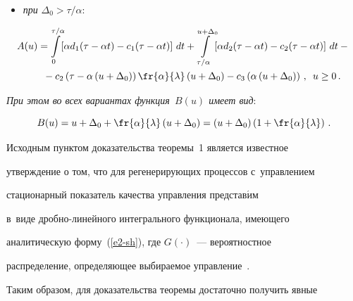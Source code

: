 \begin{itemize}
  

  \item \textit{при} $\Delta_0>\tau/\alpha$:

  \begin{multline}

  \hspace*{-6mm}A(u)=\!\int\limits_0^{\tau/\alpha}\!\! \left[ \alpha d_1(\tau-\alpha t)-c_1(\tau-\alpha t) 

\right]\,dt +\!\int\limits_{\tau/\alpha}^{u+\Delta_0} \!\!\left[ \alpha d_2(\tau-\alpha t) -

c_2(\tau-\alpha t)\right]\,dt-{}\\

  {}-c_2\left( \tau-\alpha\left( u+\Delta_0\right)\right)\fr{\alpha}{\lambda}\left( 

u+\Delta_0\right) -c_3\left(\alpha\left( u+\Delta_0\right)\right)\,,\enskip u\geq 0\,.

  \label{e5-sh}

  \end{multline}

  \end{itemize}

  

  \textit{При этом во всех вариантах функция~$B(u)$ имеет вид}:

  \begin{equation}

  B(u)=u+\Delta_0+\fr{\alpha}{\lambda}\left( u+\Delta_0\right) =\left( 

u+\Delta_0\right) \left(1+\fr{\alpha}{\lambda}\right)\,.

  \label{e6-sh}

  \end{equation}

  

  Исходным пунктом доказательства теоремы~1 является известное 

утверждение о том, что для регенерирующих процессов с~управлением 

стационарный показатель качества управления представ$\acute{\mbox{и}}$м 

в~виде дроб\-но-ли\-ней\-но\-го интегрального функционала, имеющего 

аналитическую форму~(\ref{e2-sh}), где $G(\cdot)$~--- вероятностное 

распределение, определяющее выбираемое управление~\cite{15-sh, 16-sh}. 

Таким образом, для доказательства теоремы достаточно получить явные 

